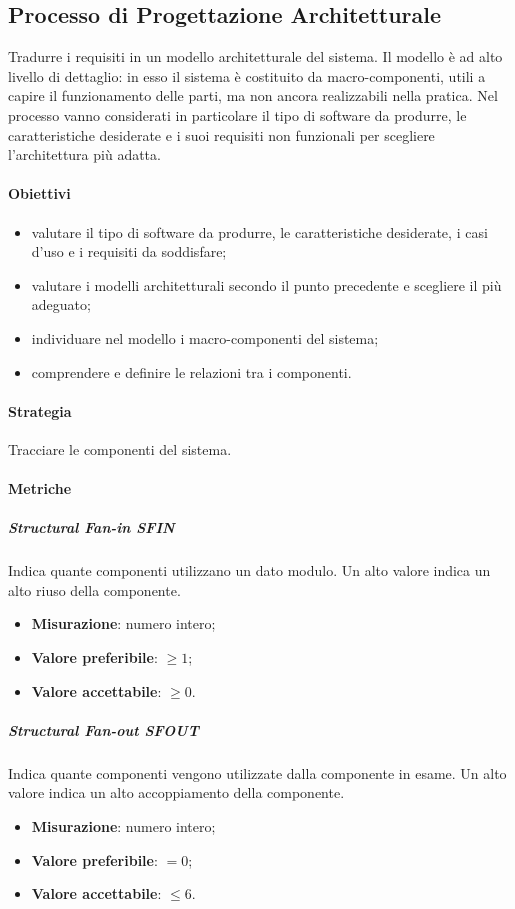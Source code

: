	\subsection{Processo di Progettazione Architetturale}
	Tradurre i requisiti in un modello architetturale del sistema.
	Il modello è ad alto livello di dettaglio: in esso il sistema è costituito da macro-componenti, utili a capire il funzionamento delle parti, ma non ancora realizzabili nella pratica.\newline
	Nel processo vanno considerati in particolare il tipo di software da produrre, le caratteristiche desiderate e i suoi requisiti non funzionali per scegliere l'architettura più adatta.
		\paragraph{Obiettivi}
		\begin{itemize}
			\item valutare il tipo di software da produrre, le caratteristiche desiderate, i casi d'uso e i requisiti da soddisfare;
			\item valutare i modelli architetturali secondo il punto precedente e scegliere il più adeguato;
			\item individuare nel modello i macro-componenti del sistema;
			\item comprendere e definire le relazioni tra i componenti.
		\end{itemize}
		\paragraph{Strategia}
		Tracciare le componenti del sistema.
		\paragraph{Metriche}
			\subparagraph{Structural Fan-in \textbf{SFIN}}
			Indica quante componenti utilizzano un dato modulo. Un alto valore indica un alto riuso della componente.
			\begin{itemize}
				\item \textbf{Misurazione}: numero intero;
				\item \textbf{Valore preferibile}: $\geq 1$;
				\item \textbf{Valore accettabile}: $\geq 0$.
			\end{itemize}
			\subparagraph{Structural Fan-out \textbf{SFOUT}}
			Indica quante componenti vengono utilizzate dalla componente in esame. Un alto valore indica un alto
accoppiamento della componente.
			\begin{itemize}
				\item \textbf{Misurazione}: numero intero;
				\item \textbf{Valore preferibile}: $=0$;
				\item \textbf{Valore accettabile}: $\leq6$.
			\end{itemize}
			

